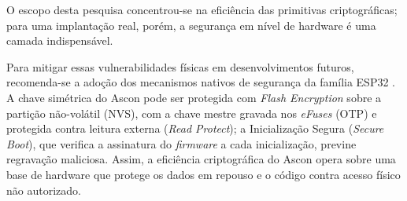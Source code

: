 O escopo desta pesquisa concentrou-se na eficiência das primitivas criptográficas; para uma implantação real, porém, a segurança em nível de hardware é uma camada indispensável.

Para mitigar essas vulnerabilidades físicas em desenvolvimentos futuros, recomenda-se a adoção dos mecanismos nativos de segurança da família ESP32 \cite{espressif2024flash} \cite{kosemen2021tamper}. A chave simétrica do Ascon pode ser protegida com \textit{Flash Encryption} sobre a partição não-volátil (NVS), com a chave mestre gravada nos \textit{eFuses} (OTP) e protegida contra leitura externa (\textit{Read Protect}); a Inicialização Segura (\textit{Secure Boot}), que verifica a assinatura do \textit{firmware} a cada inicialização, previne regravação maliciosa. Assim, a eficiência criptográfica do Ascon opera sobre uma base de hardware que protege os dados em repouso e o código contra acesso físico não autorizado.